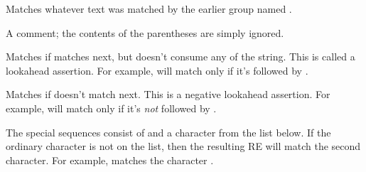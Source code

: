 \begin{list}{}{\leftmargin 0.7in }
\item[\code{(?P=\var{name})}] Matches whatever text was matched by the
earlier group named .

\item[\code{(?\#...)}] A comment; the contents of the parentheses are
simply ignored.

\item[\code{(?=...)}] Matches if  matches next, but doesn't
consume any of the string.  This is called a lookahead assertion.  For
example,  will match  only if it's
followed by .

\item[\code{(?!...)}] Matches if  doesn't match next.  This
is a negative lookahead assertion.  For example,
 will match  only if it's \emph{not}
followed by .

\end{list}

The special sequences consist of \character{\e} and a character from the
list below.  If the ordinary character is not on the list, then the
resulting RE will match the second character.  For example,
\regexp{\e\$} matches the character \character{\$}.

